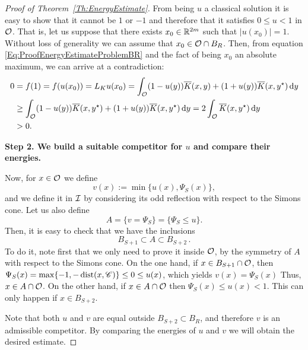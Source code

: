 \begin{proof}[Proof of Theorem~\ref{Th:EnergyEstimate}]
From being $u$ a classical solution it is easy to show that it cannot be $1$ or $-1$ and therefore that it satisfies $0\leq u < 1$ in $\mathcal{O}$. That is, let us suppose that there exists $x_0\in\mathbb{R}^{2m}$ such that $|u(x_0)|=1$. Without loss of generality we can assume that $x_0\in\mathcal{O}\cap B_R$. Then, from equation \eqref{Eq:ProofEnergyEstimateProblemBR} and the fact of being $x_0$ an absolute maximum, we can arrive at a contradiction:
\begin{align*}
0 &= f(1) = f(u(x_0)) = L_K u(x_0) = \int_{\mathcal{O}} (1-u(y)) \overline{K}(x,y) + (1+u(y)) \overline{K}(x,y^\star)  \,\mathrm{d} y \\
&\geq \int_{\mathcal{O}} (1-u(y)) \overline{K}(x,y^\star) + (1+u(y)) \overline{K}(x,y^\star)  \,\mathrm{d} y = 2\int_{\mathcal{O}} \overline{K}(x,y^\star) \,\mathrm{d} y\\
&>0.
\end{align*}

\textbf{Step 2. We build a suitable competitor for $u$ and compare their energies.}

Now, for $x\in \mathcal{O}$ we define
$$ 
v(x) := \min\{u(x),\Psi_S(x)\}, 
$$
and we define it in $\mathcal{I}$ by considering its odd reflection with respect to the Simons cone. Let us also define
$$
A = \{v=\Psi_S\} = \{\Psi_S \leq u\}. 
$$
Then, it is easy to check that we have the inclusions
\begin{equation}
\label{Eq:EnergyEstimateProofInclusionsA}
	B_{S+1} \subset A \subset B_{S+2}\,.
\end{equation}
To do it, note first that we only need to prove it inside $\mathcal{O}$, by the symmetry of $A$ with respect to the Simons cone. On the one hand, if $ x\in B_{S+1}\cap \mathcal{O}$, then $\Psi_S(x) = \max\{-1,-\operatorname{dist}(x,\mathscr{C})\} \leq 0 \leq u(x)$, which yields $v(x) = \Psi_S(x)$ Thus, $x\in A\cap \mathcal{O}$. On the other hand, if $ x\in A\cap \mathcal{O}$ then $\Psi_S(x) \leq u(x) < 1$. This can only happen if $x\in B_{S+2}$.

Note that both $u$ and $v$ are equal outside $B_{S+2} \subset B_R$, and therefore $v$ is an admissible competitor. By comparing the energies of $u$ and $v$ we will obtain the desired estimate. 


\end{proof}
